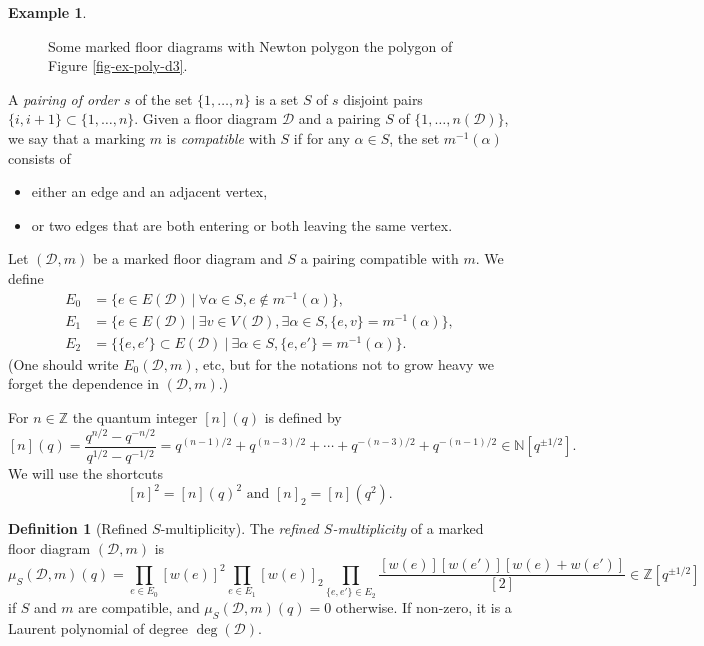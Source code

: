 \documentclass[11pt]{article}
\theoremstyle{definition}
\newtheorem{defi}[theo]{Definition}
\newtheorem{exam}[theo]{Example}
\numberwithin{equation}{section}
\newcommand{\N}{\mathbb{N}}
\newcommand{\Z}{\mathbb{Z}}
\newcommand{\D}{\mathcal{D}}
\newcommand{\dprod}{\displaystyle\prod}
\theoremstyle{plain}
\begin{document}
\begin{exam}
\begin{figure}[ht]
\begin{subfigure}[t]{0.33\textwidth}
	\caption{}
	\label{fig-exdiagmarkc}
\end{subfigure}
	\caption{Some marked floor diagrams with Newton polygon the polygon of Figure \ref{fig-ex-poly-d3}.}
	\label{fig-exdiagmark}
\end{figure}
\end{exam}


 A \emph{pairing of order $s$} of the set $\{1,\dots,n\}$ is a set $S$ of $s$ disjoint pairs $\{i,i+1\} \subset \{1,\dots,n\}$. 
 Given a floor diagram $\D$ and a pairing $S$ of $\{1,\dots,n(\D)\}$, we say that a marking $m$ is \emph{compatible} with $S$ if for any $\alpha \in S$, the set $m^{-1}(\alpha)$ consists of
 \begin{itemize}
 	\item either an edge and an adjacent vertex,
 	\item or two edges that are both entering or both leaving the same vertex.
 \end{itemize}
Let $(\D,m)$ be a marked floor diagram and $S$ a pairing compatible with $m$. We define
\begin{align*}
E_0 &= \{e \in E(\D)\ |\ \forall \alpha\in S, e \notin m^{-1}(\alpha) \}, \\
E_1 &= \{e \in E(\D)\ |\ \exists v\in V(\D), \exists \alpha\in S, \{e,v\} = m^{-1}(\alpha) \} , \\
E_2 &= \{\{e,e'\} \subset E(\D)\ |\ \exists \alpha\in S, \{e,e'\} = m^{-1}(\alpha) \}. 
\end{align*}
(One should write $E_0(\D,m)$, etc, but for the notations not to grow heavy we forget the dependence in $(\D,m)$.)


For $n\in\Z$ the quantum integer $[n](q)$ is defined by
\[ [n](q) = \dfrac{q^{n/2}-q^{-n/2}}{q^{1/2}-q^{-1/2}} = q^{(n-1)/2} + q^{(n-3)/2} + \cdots + q^{-(n-3)/2} + q^{-(n-1)/2} \in \N[q^{\pm 1/2}] . \]
We will use the shortcuts
\[ [n]^2 = [n](q)^2 \text{ and } [n]_2 = [n](q^2).  \]

\begin{defi}[Refined $S$-multiplicity] \label{def-mult-GS}
The \emph{refined $S$-multiplicity} of a marked floor diagram $(\D,m)$ is
\[ \mu_S(\D,m)(q) = \dprod_{e\in E_0} [w(e)]^2 \dprod_{e\in E_1} [w(e)]_2 \dprod_{\{e,e'\} \in E_2} \dfrac{[w(e)][w(e')][w(e)+w(e')]}{[2]} \in \Z[q^{\pm 1/2}] \]
if $S$ and $m$ are compatible, and $\mu_S(\D,m)(q)=0$ otherwise. If non-zero, it is a Laurent polynomial of degree $\deg(\D)$.
\end{defi}
\end{document}
